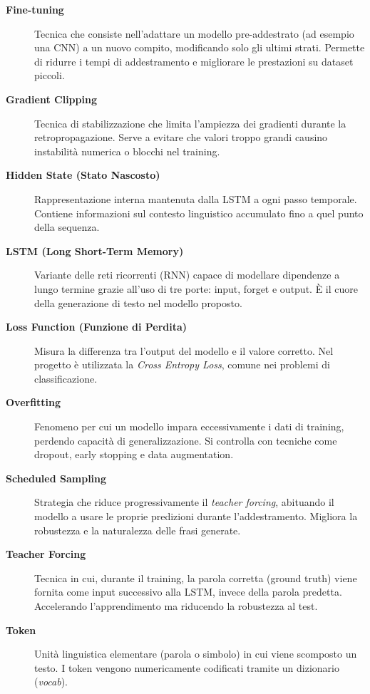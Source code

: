 \documentclass[11pt,a4paper]{report}
\begin{document}
\begin{description}
  \item[\textbf{Fine-tuning}]  
  Tecnica che consiste nell’adattare un modello pre-addestrato (ad esempio una CNN) a un nuovo compito, modificando solo gli ultimi strati.  
  Permette di ridurre i tempi di addestramento e migliorare le prestazioni su dataset piccoli.

  \item[\textbf{Gradient Clipping}]  
  Tecnica di stabilizzazione che limita l’ampiezza dei gradienti durante la retropropagazione.  
  Serve a evitare che valori troppo grandi causino instabilità numerica o blocchi nel training.

  \item[\textbf{Hidden State (Stato Nascosto)}]  
  Rappresentazione interna mantenuta dalla LSTM a ogni passo temporale.  
  Contiene informazioni sul contesto linguistico accumulato fino a quel punto della sequenza.

  \item[\textbf{LSTM (Long Short-Term Memory)}]  
  Variante delle reti ricorrenti (RNN) capace di modellare dipendenze a lungo termine grazie all’uso di tre porte: input, forget e output.  
  È il cuore della generazione di testo nel modello proposto.

  \item[\textbf{Loss Function (Funzione di Perdita)}]  
  Misura la differenza tra l’output del modello e il valore corretto.  
  Nel progetto è utilizzata la \emph{Cross Entropy Loss}, comune nei problemi di classificazione.

  \item[\textbf{Overfitting}]  
  Fenomeno per cui un modello impara eccessivamente i dati di training, perdendo capacità di generalizzazione.  
  Si controlla con tecniche come dropout, early stopping e data augmentation.

  \item[\textbf{Scheduled Sampling}]  
  Strategia che riduce progressivamente il \emph{teacher forcing}, abituando il modello a usare le proprie predizioni durante l’addestramento.  
  Migliora la robustezza e la naturalezza delle frasi generate.

  \item[\textbf{Teacher Forcing}]  
  Tecnica in cui, durante il training, la parola corretta (ground truth) viene fornita come input successivo alla LSTM, invece della parola predetta.  
  Accelerando l’apprendimento ma riducendo la robustezza al test.

  \item[\textbf{Token}]  
  Unità linguistica elementare (parola o simbolo) in cui viene scomposto un testo.  
  I token vengono numericamente codificati tramite un dizionario (\emph{vocab}).


\end{description}
\end{document}
